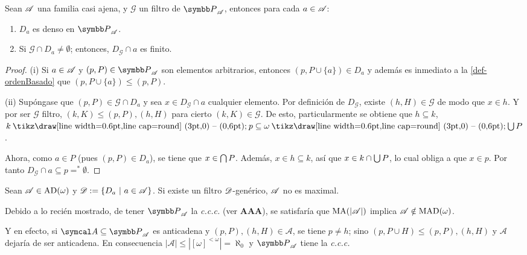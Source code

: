 \begin{lema}\label{lem-DgMagia}
	Sean $\mathscr{A}$ una familia casi ajena, y $\mathcal{G}$ un filtro de $\mathbb{P}_\ms{A}$, entonces para cada $a \in \mathscr{A}$:
	\begin{enumerate}
		\item $D_a$ es denso en $\mathbb{P}_\ms{A}$.
		\item Si $\mathcal{G} \cap D_a \neq \emptyset$; entonces, $D_\mathcal{G} \cap a$ es finito.
	\end{enumerate}
\end{lema}

\begin{proof}
	(i) Si $a \in \mathscr{A}$ y $(p,P) \in \mathbb{P}_\ms{A}$ son elementos arbitrarios, entonces $(p,P\cup\{a\}) \in D_a$ y además es inmediato a la \autoref{def-ordenBasado} que $(p,P\cup\{a\}) \leq (p,P)$.

	(ii) Supóngase que $(p,P) \in \mathcal{G} \cap D_a$ y sea $x \in D_\mathcal{G} \cap a$ cualquier elemento. Por definición de $D_\mathcal{G}$, existe $(h,H) \in \mathcal{G}$ de modo que $x \in h$. Y por ser $\mathcal{G}$ filtro, $(k,K) \leq (p,P),(h,H)$ para cierto $(k,K) \in \mathcal{G}$. De esto, particularmente se obtiene que $h \subseteq k$, $k \setminus p \subseteq \omega \setminus \midcup P$.

	Ahora, como $a \in P$ (pues $(p,P)\in D_a$), se tiene que $x \in \mbox{$\bigcap$}\, P$. Además, $x \in h \subseteq k$, así que $x \in k \cap \mbox{$\bigcup$}\, P$, lo cual obliga a que $x \in p$. Por tanto $D_\mathcal{G} \cap a \subseteq p =^* \emptyset$.
\end{proof}

\begin{corolario}\label{cor-SolovayDebil}
	Sean $\mathscr{A} \in \operatorname{AD}(\omega)$ y $\mathscr{D}:=\{D_a \text{ $|$ } a \in \mathscr{A}\}$. Si existe un filtro $\mathscr{D}$-genérico, $\mathscr{A}$ no es maximal.
\end{corolario}

Debido a lo recién mostrado, de tener $\mathbb{P}_\ms{A}$ la \textit{c.c.c.} (ver \textbf{AAA}), se satisfaría que $\operatorname{MA}(|\mathscr{A}|)$ implica $\mathscr{A} \notin \operatorname{MAD}(\omega)$.

Y en efecto, si $\mathcal{A} \subseteq \mathbb{P}_\ms{A}$ es anticadena y $(p,P),(h,H) \in \mathcal{A}$, se tiene $p\neq h$; sino $(p,P \cup H) \leq (p,P),(h,H)$ y $\mathcal{A}$ dejaría de ser anticadena. En consecuencia $|\mathcal{A}|\leq|[\omega]^{<\omega}|=\aleph_0$ y $\mathbb{P}_\ms{A}$ tiene la \textit{c.c.c.}

